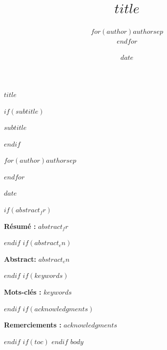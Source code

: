 \documentclass[11pt]{article}
\title{$title$}
\author{$for(author)$$author$$sep$ \\ $endfor$}
\date{$date$}
\renewcommand{\maketitle}{
  \begin{center}
  \vspace*{1cm}
  
  \begin{minipage}{\textwidth}
  \centering
  \fontsize{20}{26}\selectfont\textbf{$title$}
  \end{minipage}
  
  \vspace{2.4cm}
  
  $if(subtitle)$
  \begin{minipage}{\textwidth}
  \centering
  \fontsize{13}{16}\selectfont\itshape $subtitle$
  \end{minipage}
  $endif$
  
  \vspace{2.6cm}
  
  \begin{minipage}{\textwidth}
  \centering
  \Large
  $for(author)$$author$$sep$ \par $endfor$
  \end{minipage}
  
  \vspace{2.6cm}
  
  \Large $date$
  
  \end{center}
  \vspace{1cm}
}
\begin{document}
\maketitle
\thispagestyle{firstpage}
$if(abstract_fr)$
\begin{center}
\begin{minipage}{0.85\textwidth}
\noindent \textbf{Résumé :} $abstract_fr$
\end{minipage}
\end{center}
\vspace{0.5cm}
$endif$
$if(abstract_en)$
\begin{center}
\begin{minipage}{0.85\textwidth}
\noindent \textbf{Abstract:} $abstract_en$
\end{minipage}
\end{center}
\vspace{0.5cm}
$endif$
$if(keywords)$
\begin{center}
\begin{minipage}{0.85\textwidth}
\noindent \textbf{Mots-clés :} $keywords$
\end{minipage}
\end{center}
\vspace{0.5cm}
$endif$
$if(acknowledgments)$
\begin{center}
\begin{minipage}{0.85\textwidth}
\noindent \textbf{Remerciements :} $acknowledgments$
\end{minipage}
\end{center}
\vspace{1cm}
$endif$
$if(toc)$
\clearpage
\tableofcontents
\clearpage
$endif$
\clearpage
\pagestyle{fancy}
$body$
\end{document}
